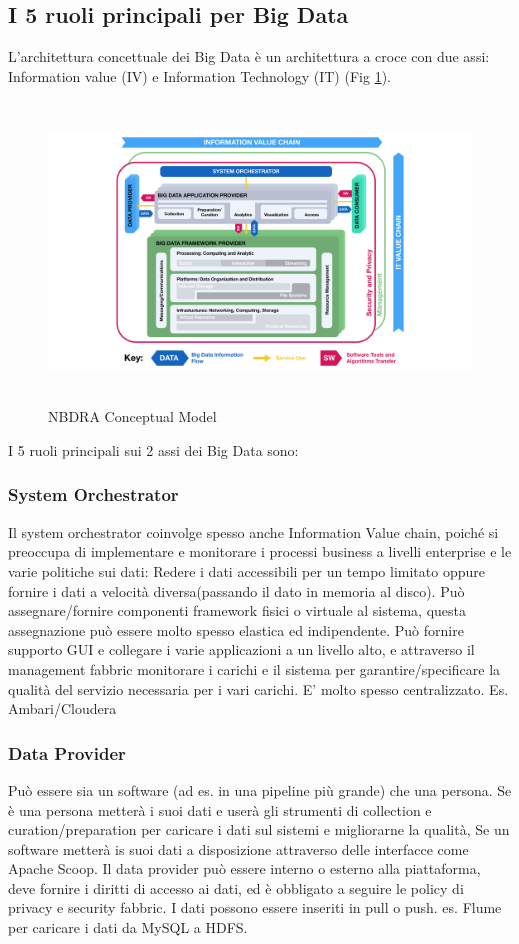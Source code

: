 \documentclass[11pt, twocolumn]{article}
\begin{document}
\subsection{I 5 ruoli principali per Big Data}
L'architettura concettuale dei Big Data è un architettura a croce con due assi: Information value (IV) e Information Technology (IT) (Fig \ref{fig:NBDRA}).\\
\begin{figure}
	\centering
	\includegraphics[width=18cm,height=8cm]{imgs/NBDRA_model}
	\caption{NBDRA Conceptual Model}
	\label{fig:NBDRA}
\end{figure}
I 5 ruoli principali sui 2 assi dei Big Data sono:
\subsubsection{System Orchestrator}
Il system orchestrator coinvolge spesso anche Information Value chain, poiché si preoccupa di implementare e monitorare i processi business a livelli enterprise e le varie politiche sui dati: Redere i dati accessibili per un tempo limitato oppure fornire i dati a velocità diversa(passando il dato in memoria al disco).
Può assegnare/fornire componenti framework fisici o virtuale al sistema, questa assegnazione può essere molto spesso elastica ed indipendente.
Può fornire supporto GUI e collegare i varie applicazioni a un livello alto, e attraverso il management fabbric monitorare i carichi e il sistema per garantire/specificare la qualità del servizio necessaria per i vari carichi.
E' molto spesso centralizzato.
Es. Ambari/Cloudera

\subsubsection{Data Provider}
Può essere sia un software (ad es. in una pipeline più grande) che una persona. Se è una persona metterà i suoi dati e userà gli strumenti di collection e curation/preparation per caricare i dati sul sistemi e migliorarne la qualità, Se un software metterà is suoi dati a disposizione attraverso delle interfacce come Apache Scoop. 
Il data provider può essere interno o esterno alla piattaforma, deve fornire i diritti di accesso ai dati, ed è obbligato a seguire le policy di privacy e security fabbric. 
I dati possono essere inseriti in pull o push.
es. Flume per caricare i dati da MySQL a HDFS.
\end{document}
